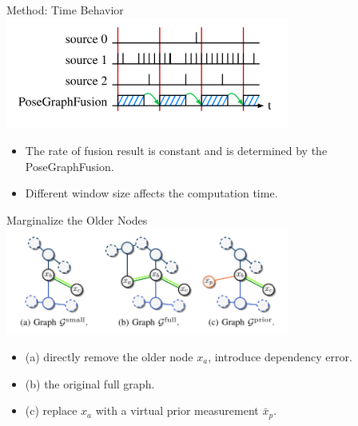 \documentclass[10pt]{beamer}
\begin{document}
	\begin{frame}{Method: Time Behavior}
		\centering
		\includegraphics[width=0.7\textwidth]{./img/timebehavior.png}
		\begin{itemize}
			\item The rate of fusion result is constant and is determined by the PoseGraphFusion.
			\item Different window size affects the computation time.
		\end{itemize}
	\end{frame}

	\begin{frame}{Marginalize the Older Nodes}
		\centering
		\includegraphics[width=0.7\textwidth]{./img/schur.png}
		\begin{itemize}
			\item (a) directly remove the older node $x_a$, introduce dependency error.
			\item (b) the original full graph.
			\item (c) replace $x_a$ with a virtual prior measurement $\bar{x}_p$.
		\end{itemize}
	\end{frame}
\end{document}

